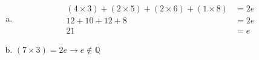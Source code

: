 \label{ch2ex:12}
\begin{enumerate}[a)]
\item
  \begin{align*}
    (4 \times 3) + (2 \times 5) + (2 \times 6) + (1 \times 8) &= 2e \\
    12 + 10 + 12 + 8 &= 2e \\
    21 &= e
  \end{align*}
\item $(7 \times 3) = 2e \to e \not\in \mathbb{Q}$
\end{enumerate}
